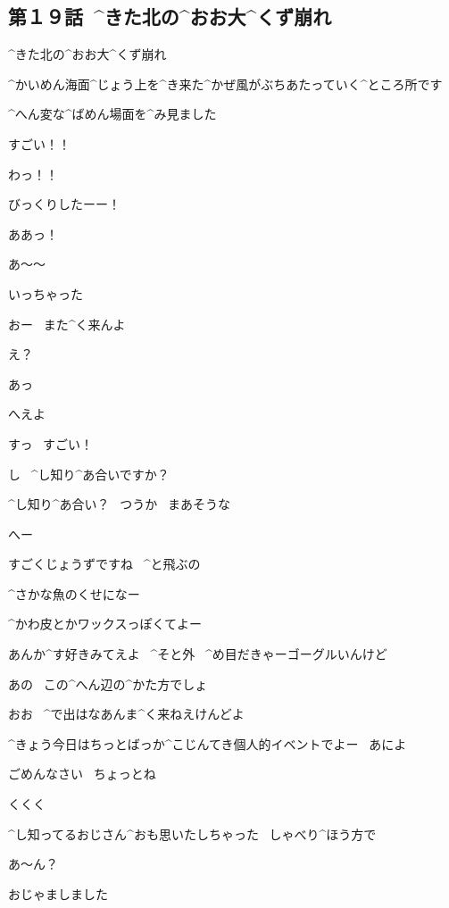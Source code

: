 \subsection{第１９話\ ^{きた}{北}の^{おお}{大}^{くず}{崩}れ}

\page[52]
\Alpha ^{きた}{北}の^{おお}{大}^{くず}{崩}れ

\Alpha ^{かいめん}{海面}^{じょう}{上}を^{き}{来}た^{かぜ}{風}がぶちあたっていく^{ところ}{所}です

\page[53]
\Alpha ^{へん}{変}な^{ばめん}{場面}を^{み}{見}ました

\page[55]
\Alpha すごい！！

\Ayase わっ！！

\Ayase びっくりしたーー！

\Alpha ああっ！

\page[57]
\Alpha あ〜〜

\Alpha いっちゃった

\Ayase おー
\ また^{く}{来}んよ

\Alpha え？

\Alpha あっ

\page[58]
\Ayase へえよ

\Alpha すっ
\ すごい！

\Alpha し
\ ^{し}{知}り^{あ}{合}いですか？

\Ayase ^{し}{知}り^{あ}{合}い？
\ つうか
\ まあそうな

\page[59]
\Alpha へー

\page[60]
\Alpha すごくじょうずですね
\ ^{と}{飛}ぶの

\Ayase ^{さかな}{魚}のくせになー

\Ayase ^{かわ}{皮}とかワックスっぽくてよー

\Ayase あんか^{す}{好}きみてえよ
\ ^{そと}{外}
\ ^{め}{目}だきゃーゴーグルいんけど

\page[61]
\Alpha あの
\ この^{へん}{辺}の^{かた}{方}でしょ

\Ayase おお
\ ^{で}{出}はなあんま^{く}{来}ねえけんどよ

\Ayase ^{きょう}{今日}はちっとばっか^{こじんてき}{個人的}イベントでよー
\ あによ

\Alpha ごめんなさい
\ ちょっとね

\Alpha くくく

\Alpha ^{し}{知}ってるおじさん^{おも}{思}いたしちゃった
\ しゃべり^{ほう}{方}で

\Ayase あ〜ん？

\page[62]
\Alpha おじゃましました


